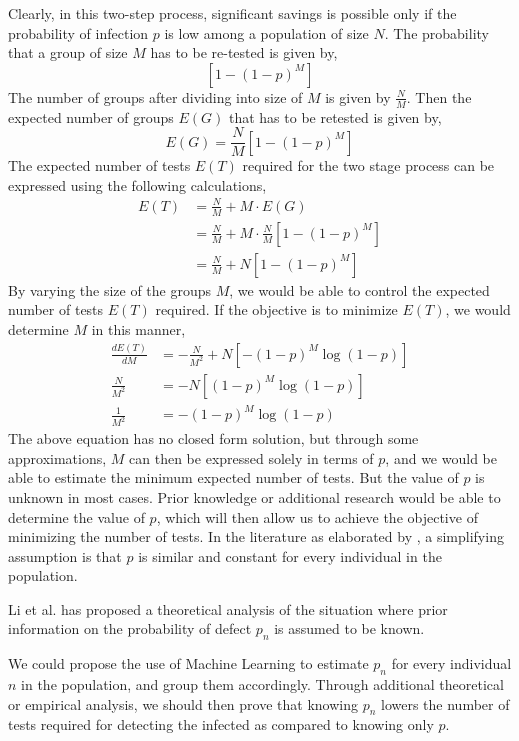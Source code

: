 \documentclass[10pt]{article}
\begin{document}
Clearly, in this two-step process, significant savings is possible only if the probability of infection $p$ is low among a population of size $N$. The probability that a group of size $M$ has to be re-tested is given by,
\[ \left[ 1 - (1-p)^M \right] \]
The number of groups after dividing into size of $M$ is given by $\frac{N}{M}$. Then the expected number of groups $E(G)$ that has to be retested is given by,
\[ E(G) = \frac{N}{M} \left[ 1 - (1-p)^M \right] \]
The expected number of tests $E(T)$ required for the two stage process can be expressed using the following calculations,
\begin{align*}
	E(T) &= \frac{N}{M} + M \cdot E(G) \\
	& = \frac{N}{M} + M \cdot \frac{N}{M} \left[ 1 - (1-p)^M \right] \\
	& = \frac{N}{M} + N \left[ 1 - (1-p)^M \right]
\end{align*}
By varying the size of the groups $M$, we would be able to control the expected number of tests $E(T)$ required. If the objective is to minimize $E(T)$, we would determine $M$ in this manner,
\begin{align*}
	\frac{d E(T)}{d M} &= - \frac{N}{M^2} + N \left[ - (1-p)^M \log(1-p) \right] \\
	\frac{N}{M^2} &= - N \left[ (1-p)^M \log(1-p) \right] \\
	\frac{1}{M^2} &= -(1-p)^M \log(1-p)
\end{align*}
The above equation has no closed form solution, but through some approximations, $M$ can then be expressed solely in terms of $p$, and we would be able to estimate the minimum expected number of tests.
But the value of $p$ is unknown in most cases. Prior knowledge or additional research would be able to determine the value of $p$, which will then allow us to achieve the objective of minimizing the number of tests. In the literature as elaborated by \cite{Dorfman1943,Mezard2008,Mezard2011}, a simplifying assumption is that $p$ is similar and constant for every individual in the population. 

Li et al. \cite{Li2014} has proposed a theoretical analysis of the situation where prior information on the probability of defect $p_n$ is assumed to be known.

We could propose the use of Machine Learning to estimate $p_n$ for every individual $n$ in the population, and group them accordingly. Through additional theoretical or empirical analysis, we should then prove that knowing $p_n$ lowers the number of tests required for detecting the infected as compared to knowing only $p$.
\end{document}
